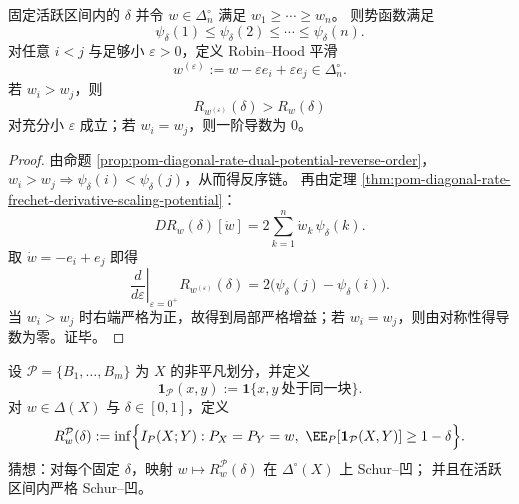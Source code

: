 \begin{proposition}\label{prop:pom-diagonal-rate-robinhood-gain}
固定活跃区间内的 \(\delta\) 并令 \(w\in\Delta_n^\circ\) 满足
\(
w_1\ge\cdots\ge w_n
\)。
则势函数满足
\[
\psi_\delta(1)\le \psi_\delta(2)\le\cdots\le \psi_\delta(n).
\]
对任意 \(i<j\) 与足够小 \(\varepsilon>0\)，定义 Robin--Hood 平滑
\[
w^{(\varepsilon)}:=w-\varepsilon e_i+\varepsilon e_j\in\Delta_n^\circ.
\]
若 \(w_i>w_j\)，则
\[
R_{w^{(\varepsilon)}}(\delta)>R_w(\delta)
\]
对充分小 \(\varepsilon\) 成立；若 \(w_i=w_j\)，则一阶导数为 \(0\)。
\end{proposition}
\begin{proof}
由命题 \ref{prop:pom-diagonal-rate-dual-potential-reverse-order}，
\(
w_i>w_j\Rightarrow \psi_\delta(i)<\psi_\delta(j)
\)，从而得反序链。
再由定理 \ref{thm:pom-diagonal-rate-frechet-derivative-scaling-potential}：
\[
DR_w(\delta)[\dot w]=2\sum_{k=1}^n \dot w_k\,\psi_\delta(k).
\]
取 \(\dot w=-e_i+e_j\) 即得
\[
\left.\frac{d}{d\varepsilon}\right|_{\varepsilon=0^+}
R_{w^{(\varepsilon)}}(\delta)
=2\bigl(\psi_\delta(j)-\psi_\delta(i)\bigr).
\]
当 \(w_i>w_j\) 时右端严格为正，故得到局部严格增益；若 \(w_i=w_j\)，则由对称性得导数为零。证毕。
\end{proof}

\begin{conjecture}\label{conj:pom-block-consistency-schur-concavity}
设 \(\mathcal P=\{B_1,\dots,B_m\}\) 为 \(X\) 的非平凡划分，并定义
\[
\mathbf 1_{\mathcal P}(x,y):=\mathbf 1\{x,y\ \text{处于同一块}\}.
\]
对 \(w\in\Delta(X)\) 与 \(\delta\in[0,1]\)，定义
\[
R_w^{\mathcal P}(\delta):=
\inf\Bigl\{
I_P(X;Y):
P_X=P_Y=w,\ 
\EE_P[\mathbf 1_{\mathcal P}(X,Y)]\ge 1-\delta
\Bigr\}.
\]
猜想：对每个固定 \(\delta\)，映射 \(w\mapsto R_w^{\mathcal P}(\delta)\) 在 \(\Delta^\circ(X)\) 上 Schur--凹；
并且在活跃区间内严格 Schur--凹。
\end{conjecture}
